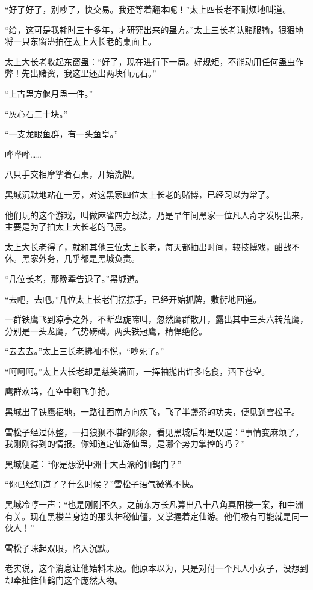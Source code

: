 \begin{this_body}
“好了好了，别吵了，快交易。我还等着翻本呢！”太上四长老不耐烦地叫道。

“给，这可是我耗时三十多年，才研究出来的蛊方。”太上三长老认赌服输，狠狠地将一只东窗蛊拍在太上大长老的桌面上。

太上大长老收起东窗蛊：“好了，现在进行下一局。好规矩，不能动用任何蛊虫作弊！先出赌资，我这里还出两块仙元石。”

“上古蛊方偃月蛊一件。”

“灰心石二十块。”

“一支龙眼鱼群，有一头鱼皇。”

哗哗哗……

八只手交相摩挲着石桌，开始洗牌。

黑城沉默地站在一旁，对这黑家四位太上长老的赌博，已经习以为常了。

他们玩的这个游戏，叫做麻雀四方战法，乃是早年间黑家一位凡人奇才发明出来，主要是为了拍太上大长老的马屁。

太上大长老得了，就和其他三位太上长老，每天都抽出时间，较技搏戏，酣战不休。黑家外务，几乎都是黑城负责。

“几位长老，那晚辈告退了。”黑城道。

“去吧，去吧。”几位太上长老们摆摆手，已经开始抓牌，敷衍地回道。

一群铁鹰飞到凉亭之外，不断盘旋啼叫，忽然鹰群散开，露出其中三头六转荒鹰，分别是一头龙鹰，气势磅礴。两头铁冠鹰，精悍绝伦。

“去去去。”太上三长老拂袖不悦，“吵死了。”

“呵呵呵。”太上大长老却是慈笑满面，一挥袖抛出许多吃食，洒下苍空。

鹰群欢鸣，在空中翻飞争抢。

黑城出了铁鹰福地，一路往西南方向疾飞，飞了半盏茶的功夫，便见到雪松子。

雪松子经过休整，一扫狼狈不堪的形象，看见黑城后却是叹道：“事情变麻烦了，我刚刚得到的情报。你知道定仙游仙蛊，是哪个势力掌控的吗？”

黑城便道：“你是想说中洲十大古派的仙鹤门？”

“你已经知道了？什么时候？”雪松子语气微微不快。

黑城冷哼一声：“也是刚刚不久。之前东方长凡算出八十八角真阳楼一案，和中洲有关。现在黑楼兰身边的那头神秘仙僵，又掌握着定仙游。他们极有可能就是同一伙人！”

雪松子眯起双眼，陷入沉默。

老实说，这个消息让他始料未及。他原本以为，只是对付一个凡人小女子，没想到却牵扯住仙鹤门这个庞然大物。


\end{this_body}
